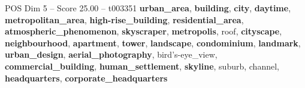 \begin{textsample}{POS Dim 5 – Score 25.00 – t003351}  \label{ex:f5_pos_005}
\textbf{urban\_area}, \textbf{building}, \textbf{city}, \textbf{daytime}, \textbf{metropolitan\_area}, \textbf{high-rise\_building}, \textbf{residential\_area}, \textbf{atmospheric\_phenomenon}, \textbf{skyscraper}, \textbf{metropolis}, roof, \textbf{cityscape}, \textbf{neighbourhood}, \textbf{apartment}, \textbf{tower}, \textbf{landscape}, \textbf{condominium}, \textbf{landmark}, \textbf{urban\_design}, \textbf{aerial\_photography}, bird's-eye\_view, \textbf{commercial\_building}, \textbf{human\_settlement}, \textbf{skyline}, suburb, channel, \textbf{headquarters}, \textbf{corporate\_headquarters}

\end{textsample}
